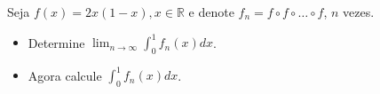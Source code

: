 Seja \(f(x)=2x(1-x), x\in\mathbb{R}\) e denote \(f_n=f\circ f\circ \dots \circ f\), \(n\) vezes. 

\begin{itemize}
\item[(a)] Determine \(\lim_{n\rightarrow\infty} \int^1_0 f_n(x)dx\).
\item[(b)] Agora calcule \(\int^1_0 f_n(x)dx\).
\end{itemize}
